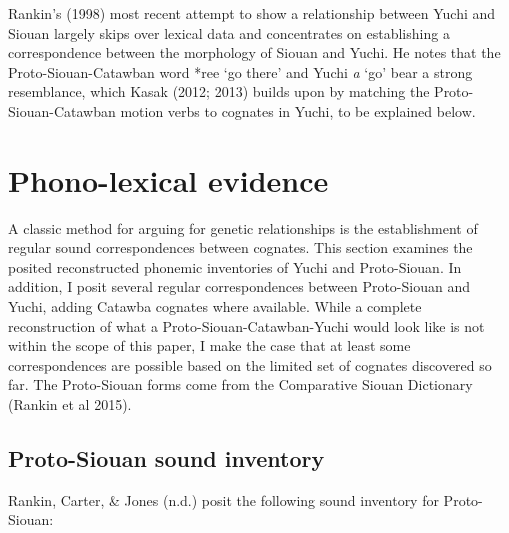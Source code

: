 \documentclass[output=paper]{LSP/langsci}
\begin{document}
Rankin's (1998) most recent attempt to show a relationship between Yuchi and Siouan largely skips over lexical data and concentrates on establishing a correspondence between the morphology of Siouan and Yuchi. He notes that the Proto-Siouan-Catawban word *ree `go there' and Yuchi \emph{\textbeltl a} `go' bear a strong resemblance, which Kasak (2012; 2013) builds upon by matching the Proto-Siouan-Catawban motion verbs to cognates in Yuchi, to be explained below.

\section{Phono-lexical evidence}

A classic method for arguing for genetic relationships is the establishment of regular sound correspondences between cognates. This section examines the posited reconstructed phonemic inventories of Yuchi and Proto-Siouan. In addition, I posit several regular correspondences between Proto-Siouan and Yuchi, adding Catawba cognates where available. While a complete reconstruction of what a Proto-Siouan-Catawban-Yuchi would look like is not within the scope of this paper, I make the case that at least some correspondences are possible based on the limited set of cognates discovered so far. The Proto-Siouan forms come from the Comparative Siouan Dictionary (Rankin et al 2015).

\subsection{Proto-Siouan sound inventory}

Rankin, Carter, \& Jones (n.d.) posit the following sound inventory for Proto-Siouan:
\end{document}
